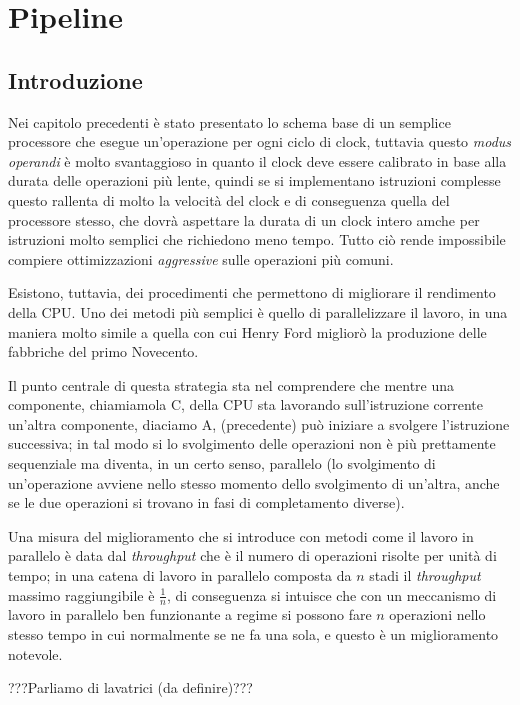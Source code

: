 \documentclass[class=book, crop=false, oneside]{standalone}
\begin{document}
\chapter{Pipeline}

\section{Introduzione}
Nei capitolo precedenti è stato presentato lo schema base di un semplice processore che esegue un'operazione per ogni ciclo di clock, tuttavia questo \emph{modus operandi} è molto svantaggioso in quanto il clock deve essere calibrato in base alla durata delle operazioni più lente, quindi se si implementano istruzioni complesse questo rallenta di molto la velocità del clock e di conseguenza quella del processore stesso, che dovrà aspettare la durata di un clock intero amche per istruzioni molto semplici che richiedono meno tempo.
Tutto ciò rende impossibile compiere ottimizzazioni \emph{aggressive} sulle operazioni più comuni.

Esistono, tuttavia, dei procedimenti che permettono di migliorare il rendimento della CPU.
Uno dei metodi più semplici è quello di parallelizzare il lavoro, in una maniera molto simile a quella con cui Henry Ford migliorò la produzione delle fabbriche del primo Novecento.

Il punto centrale di questa strategia sta nel comprendere che mentre una componente, chiamiamola C, della CPU sta lavorando sull'istruzione corrente un'altra componente, diaciamo A, (precedente) può iniziare a svolgere l'istruzione successiva; in tal modo si lo svolgimento delle operazioni non è più prettamente sequenziale ma diventa, in un certo senso, parallelo (lo svolgimento di un'operazione avviene nello stesso momento dello svolgimento di un'altra, anche se le due operazioni si trovano in fasi di completamento diverse).

Una misura del miglioramento che si introduce con metodi come il lavoro in parallelo è data dal \emph{throughput} che è il numero di operazioni risolte per unità di tempo; in una catena di lavoro in parallelo composta da \(n\) stadi il \emph{throughput} massimo raggiungibile è \(\frac{1}{n}\), di conseguenza si intuisce che con un meccanismo di lavoro in parallelo ben funzionante a regime si possono fare \(n\) operazioni nello stesso tempo in cui normalmente se ne fa una sola, e questo è un miglioramento notevole.

???Parliamo di lavatrici (da definire)???
\end{document}
